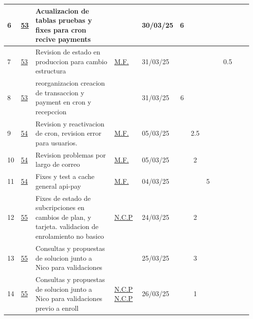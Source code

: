 \documentclass{article}
\begin{document}
\begin{longtable}{|m{0.3cm}|m{1cm}|p{3cm}|m{1.5cm}|m{1.3cm}||c|c|c|c|c|c|c| |}
                 \label{6}6  &  \hyperref[53]{\color{blue}53}  & Acualizacion de tablas pruebas y fixes para cron recive payments &  
                 & 30/03/25   & 6 &  &  &  &  &  & \\ \hline 

                 \label{7}7  &  \hyperref[53]{\color{blue}53}  & Revision de estado en produccion para cambio estructura &  
                  \hyperref[M.F.]{\color{blue}M.F.}  & 31/03/25   &  &  &  &  & 0.5 &  & \\ \hline 

                 \label{8}8  &  \hyperref[53]{\color{blue}53}  & reorganizacion creacion de transaccion y payment en cron y recepccion &  
                 & 31/03/25   & 6 &  &  &  &  &  & \\ \hline 

                 \label{9}9  &  \hyperref[54]{\color{blue}54}  & Revision y reactivacion de cron, revision error para usuarios. &  
                  \hyperref[M.F.]{\color{blue}M.F.}  & 05/03/25   &  & 2.5 &  &  &  &  & \\ \hline 

                 \label{10}10  &  \hyperref[54]{\color{blue}54}  & Revision problemas por largo de correo &  
                  \hyperref[M.F.]{\color{blue}M.F.}  & 05/03/25   &  & 2 &  &  &  &  & \\ \hline 

                 \label{11}11  &  \hyperref[54]{\color{blue}54}  & Fixes y test a cache general api-pay &  
                  \hyperref[M.F.]{\color{blue}M.F.}  & 04/03/25   &  &  & 5 &  &  &  & \\ \hline 

                 \label{12}12  &  \hyperref[55]{\color{blue}55}  & Fixes de estado de subcripciones en cambios de plan, y tarjeta. validacion de enrolamiento no basico &  
                  \hyperref[N.C.P]{\color{blue}N.C.P}  & 24/03/25   &  & 2 &  &  &  &  & \\ \hline 

                 \label{13}13  &  \hyperref[55]{\color{blue}55}  & Consultas y propuestas de solucion junto a Nico para validaciones &  
                 & 25/03/25   &  & 3 &  &  &  &  & \\ \hline 

                 \label{14}14  &  \hyperref[55]{\color{blue}55}  & Consultas y propuestas de solucion junto a Nico para validaciones previo a enroll &  
                  \hyperref[N.C.P]{\color{blue}N.C.P} \newline  \hyperref[N.C.P]{\color{blue}N.C.P}  & 26/03/25   &  & 1 &  &  &  &  & \\ \hline 

    \end{longtable} 
 \newpage
\end{document}
